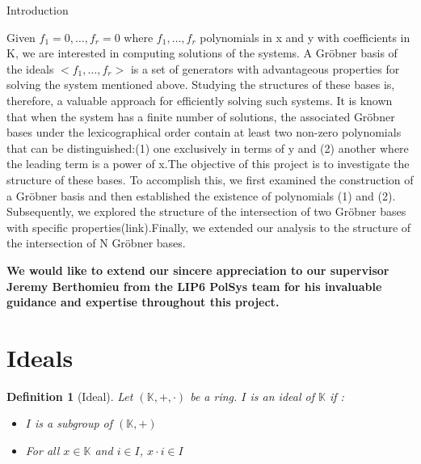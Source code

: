 \documentclass{article}
\newtheorem{definition}{Definition}[section]
\begin{document}
\begin{center}
    
\LARGE{Introduction\\}
\end{center}
Given $f_{1}=0,\dots,f_{r}=0$ where $f_{1},\dots,f_{r}$ polynomials in x and y with coefficients in K, we are interested in computing solutions of the systems. A Gröbner basis of the ideals $<f_{1},\dots,f_{r}>$ is a set of generators with advantageous properties for solving the system mentioned above. Studying the structures of these bases is, therefore, a valuable approach for efficiently solving such systems.\newline
It is known that when the system has a finite number of solutions, the associated Gröbner bases under the lexicographical order contain at least two non-zero polynomials that can be distinguished:(1) one exclusively in terms of y and (2) another where the leading term is a power of x.The objective of this project is to investigate the structure of these bases.\newline
To accomplish this, we first examined the construction of a Gröbner basis and then established the existence of polynomials (1) and (2). Subsequently, we explored the structure of the intersection of two Gröbner bases with specific properties(link).Finally, we extended our analysis to the structure of the intersection of N Gröbner bases.
\newpage

\textbf{We would like to extend our sincere appreciation to our supervisor Jeremy Berthomieu from the LIP6 PolSys  team for his invaluable guidance and expertise throughout this project.}
\newpage

\tableofcontents
\newpage
      


\section{Ideals}

\begin{definition}[Ideal]
    Let $(\mathbb{K}, +, \cdot)$ be a ring. $I$ is an ideal of $\mathbb{K}$ if : 
    \begin{itemize}
        \item $I$ is a subgroup of $(\mathbb{K}, +)$
        \item For all $x \in \mathbb{K}$ and $i \in I$, $x \cdot i \in I$
    \end{itemize}
\end{definition}
\end{document}
